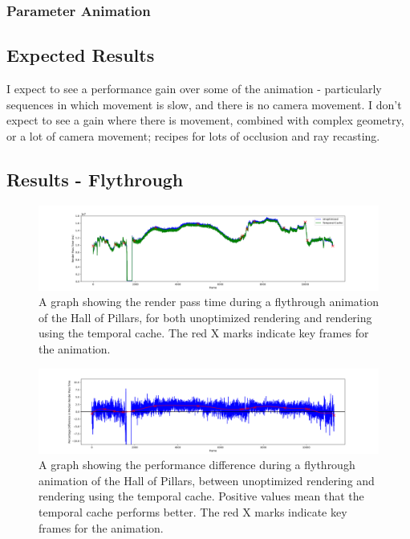 \subsubsection{Parameter Animation}

\subsection{Expected Results}

I expect to see a performance gain over some of the animation - particularly sequences in which movement is slow, and there is no camera movement. I don't expect to see a gain where there is movement, combined with complex geometry, or a lot of camera movement; recipes for lots of occlusion and ray recasting.

\subsection{Results - Flythrough}

\begin{figure}[ht]
	\centering
	\includegraphics[width=\linewidth, frame]{Images/Results/Hall-Of-Pillars-Flythrough-Animation.png}
	\caption{A graph showing the render pass time during a flythrough animation of the Hall of Pillars, for both unoptimized rendering and rendering using the temporal cache. The red X marks indicate key frames for the animation.}
	\label{figure:hall-of-pillars-flythrough-animation}
\end{figure}

\begin{figure}[ht]
	\centering
	\includegraphics[width=\linewidth, frame]{Images/Results/Hall-Of-Pillars-Flythrough-Animation-Gain.png}
	\caption{A graph showing the performance difference during a flythrough animation of the Hall of Pillars, between unoptimized rendering and rendering using the temporal cache. Positive values mean that the temporal cache performs better. The red X marks indicate key frames for the animation.}
	\label{figure:hall-of-pillars-flythrough-animation-gain}
\end{figure}

